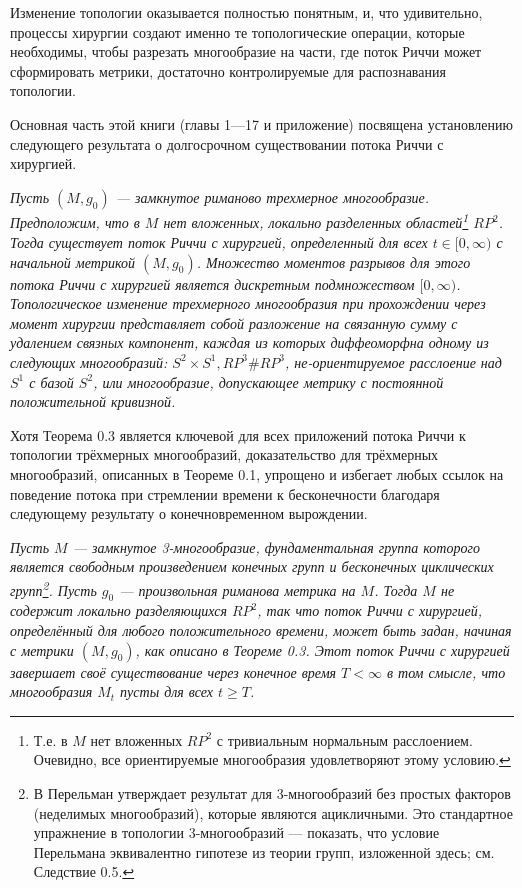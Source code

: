 Изменение топологии оказывается полностью понятным, и, что удивительно, 
процессы хирургии создают именно те топологические операции, которые необходимы, 
чтобы разрезать многообразие на части, где поток Риччи может сформировать 
метрики, достаточно контролируемые для распознавания топологии.

Основная часть этой книги (главы 1—17 и приложение) посвящена установлению 
следующего результата о долгосрочном существовании потока Риччи с хирургией.

\begin{theorem}
\textit{Пусть $(M, g_{0})$ — замкнутое риманово трехмерное 
многообразие. Предположим, что в $M$ нет вложенных, локально разделенных областей\footnote{Т.е. в $M$ нет вложенных $RP^{2}$ с тривиальным нормальным расслоением. Очевидно, все ориентируемые многообразия удовлетворяют этому условию.} 
$RP^{2}$. Тогда существует поток Риччи с хирургией, 
определенный для всех $t\in [0,\infty)$ с начальной метрикой $(M, g_{0})$. 
Множество моментов разрывов для этого потока Риччи с хирургией является 
дискретным подмножеством $[0,\infty)$.
Топологическое изменение трехмерного многообразия при прохождении через 
момент хирургии представляет собой разложение на связанную сумму с 
удалением связных компонент, каждая из которых диффеоморфна одному из 
следующих многообразий: $S^{2}\times S^{1}, RP^{3} \# RP^{3}$, не-ориентируемое 
расслоение над $S^{1}$ с базой $S^{2}$, или многообразие, допускающее 
метрику с постоянной положительной кривизной.}
\end{theorem}

Хотя Теорема 0.3 является ключевой для всех приложений потока Риччи к 
топологии трёхмерных многообразий, доказательство для трёхмерных многообразий, 
описанных в Теореме 0.1, упрощено и избегает любых ссылок на поведение потока 
при стремлении времени к бесконечности благодаря следующему результату о 
конечновременном вырождении.

\begin{theorem}
\textit{Пусть $M$ — замкнутое 3-многообразие, фундаментальная группа которого 
является свободным произведением конечных групп и бесконечных циклических групп\footnote{В \cite{c54} Перельман утверждает результат для 3-многообразий без простых факторов (неделимых многообразий), которые являются ацикличными. Это стандартное упражнение в топологии 3-многообразий — показать, что условие Перельмана эквивалентно гипотезе из теории групп, изложенной здесь; см. Следствие 0.5.}. 
Пусть $g_{0}$ — произвольная риманова метрика на $M$. Тогда $M$ не содержит локально 
разделяющихся $RP^{2}$, так что поток Риччи с хирургией, определённый для любого 
положительного времени, может быть задан, начиная с метрики $(M,g_{0})$, как описано 
в Теореме 0.3. Этот поток Риччи с хирургией завершает своё существование через 
конечное время $T<\infty$ в том смысле, что многообразия $M_{t}$ пусты для всех $t \geq T$.}
\end{theorem}

